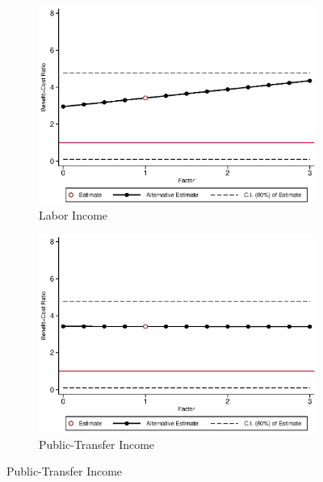 \begin{figure}[H]
\caption{Benefit-Cost Ratio vs.~Components, Females} \label{fig:bcrf_factor_f}

	\begin{subfigure}[h]{0.8\textwidth}
	\centering
	\caption{Labor Income} \label{fig:bcrf_inc_labor_f1}
	\includegraphics[width=\textwidth]{AppOutput/Sensitivity/bcrf_inc_labor_f1.eps}
	\end{subfigure}	
	
	\begin{subfigure}[h]{0.8\textwidth}
	\centering
	\caption{Public-Transfer Income} \label{fig:bcrf_transfer_f1}
	\includegraphics[width=\textwidth]{AppOutput/Sensitivity/bcrf_transfer_f1.eps}
	\end{subfigure}
\end{figure}
	
